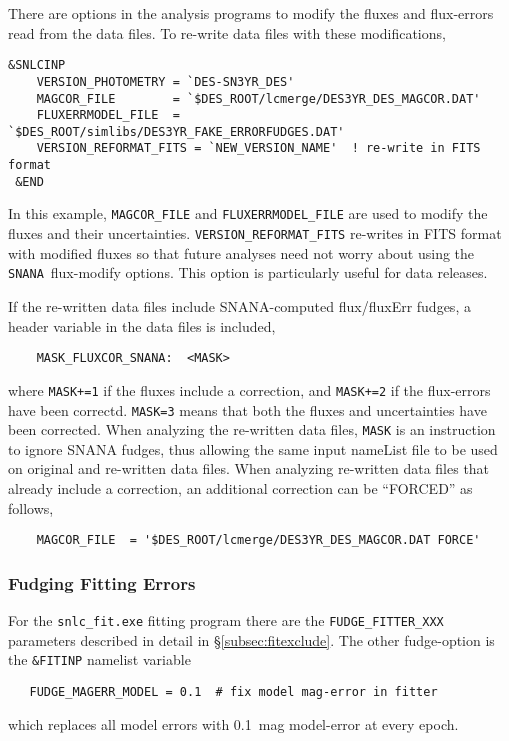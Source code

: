 \documentclass[12pt]{article}
\newcommand{\snana}{{\tt SNANA}}
\begin{document}
There are options in the analysis programs to modify
the fluxes and flux-errors read from the data files. 
To re-write data files with these modifications,
%
\begin{Verbatim}[frame=single]
  &SNLCINP
    VERSION_PHOTOMETRY = `DES-SN3YR_DES'
    MAGCOR_FILE        = `$DES_ROOT/lcmerge/DES3YR_DES_MAGCOR.DAT'
    FLUXERRMODEL_FILE  = `$DES_ROOT/simlibs/DES3YR_FAKE_ERRORFUDGES.DAT'
    VERSION_REFORMAT_FITS = `NEW_VERSION_NAME'  ! re-write in FITS format
 &END
\end{Verbatim}
%
In this example, {\tt MAGCOR\_FILE} and {\tt FLUXERRMODEL\_FILE} 
are used to modify the fluxes and their uncertainties.
{\tt VERSION\_REFORMAT\_FITS} re-writes in FITS format with 
modified fluxes so that future analyses need not worry about
using the \snana\ flux-modify options. 
This option is particularly useful for data releases.

If the re-written data files include SNANA-computed flux/fluxErr fudges,
a header variable in the data files is included,
\begin{verbatim}
    MASK_FLUXCOR_SNANA:  <MASK>
\end{verbatim}
%
where {\tt MASK+=1} if the fluxes include a correction,
and {\tt MASK+=2} if the flux-errors have been correctd.
{\tt MASK=3} means that both the fluxes and uncertainties have
been corrected. When analyzing the re-written data files,
{\tt MASK} is an instruction to ignore SNANA fudges, thus
allowing the same input nameList file to be used on original
and re-written data files. When analyzing re-written data files
that already include a correction, an additional correction 
can be ``FORCED'' as follows,
%
\begin{verbatim}
    MAGCOR_FILE  = '$DES_ROOT/lcmerge/DES3YR_DES_MAGCOR.DAT FORCE'
\end{verbatim}

  \subsubsection{Fudging Fitting Errors}
  \label{sss:fudge_fit_errors}


For the {\tt snlc\_fit.exe} fitting program there are the 
{\tt FUDGE\_FITTER\_XXX} parameters described in detail in 
\S\ref{subsec:fitexclude}.
The other fudge-option is the {\tt \&FITINP} namelist  variable
\begin{verbatim}
   FUDGE_MAGERR_MODEL = 0.1  # fix model mag-error in fitter
\end{verbatim}
%
which replaces all model errors  with 0.1~mag model-error
at every epoch.
\end{document}
